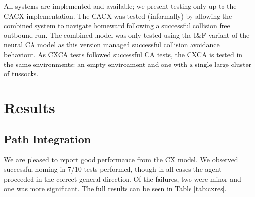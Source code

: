\documentclass[a4paper,11pt,twoside,openright]{article}
\let\oldsection\section
\def\section{\cleardoublepage\oldsection}
\begin{document}
All systems are implemented and available; we present testing only up
to the CACX implementation. The CACX was tested (informally) by
allowing the combined system to navigate homeward following a
successful collision free outbound run. The combined model was
only tested using the I\&F variant of the neural CA model as this
version managed successful collision avoidance behaviour. As CXCA
tests followed successful CA tests, the CXCA is tested in the same
environments: an empty environment and one with a single large
cluster of tussocks.


\section{ Results } \label{sec:results}
\subsection{ Path Integration }
We are pleased to report good performance from the CX model. We
observed successful homing in 7/10 tests performed, though in all
cases the agent proceeded in the correct general direction. Of the
failures, two were minor and one was more significant. The full
results can be seen in Table \ref{tab:cxres}.
\newline
\par
\end{document}
